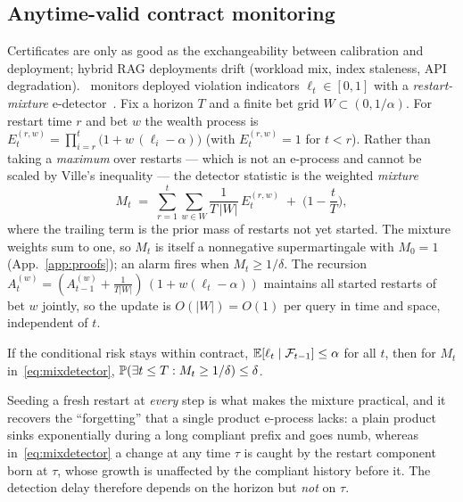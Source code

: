 \subsection{Anytime-valid contract monitoring}
\label{sec:monitor}

Certificates are only as good as the exchangeability between calibration
and deployment; hybrid RAG deployments drift (workload mix, index
staleness, API degradation). \system\ monitors deployed violation
indicators $\ell_t \in [0,1]$ with a \emph{restart-mixture}
e-detector~\cite{shin2024edetectors,ramdas2023savi}. Fix a horizon $T$ and
a finite bet grid $W \subset (0, 1/\alpha)$. For restart time $r$ and bet
$w$ the wealth process is
$E_t^{(r,w)} = \prod_{i=r}^{t} \big(1 + w\,(\ell_i - \alpha)\big)$
(with $E_t^{(r,w)} = 1$ for $t < r$). Rather than taking a
\emph{maximum} over restarts --- which is not an e-process and cannot be
scaled by Ville's inequality --- the detector statistic is the weighted
\emph{mixture}
\begin{equation}
\label{eq:mixdetector}
M_t \;=\; \sum_{r=1}^{t}\sum_{w \in W}
  \frac{1}{T\,|W|}\, E_t^{(r,w)} \;+\; \Big(1 - \frac{t}{T}\Big),
\end{equation}
where the trailing term is the prior mass of restarts not yet started. The
mixture weights sum to one, so $M_t$ is itself a nonnegative
supermartingale with $M_0 = 1$ (App.~\ref{app:proofs}); an alarm fires when
$M_t \ge 1/\delta$. The recursion $A^{(w)}_t = (A^{(w)}_{t-1} +
\tfrac{1}{T|W|})\,(1 + w(\ell_t - \alpha))$ maintains all started restarts
of bet $w$ jointly, so the update is $O(|W|) = O(1)$ per query in time and
space, independent of $t$.

\begin{proposition}
\label{prop:eprocess}
If the conditional risk stays within contract,
$\mathbb{E}[\ell_t \mid \mathcal{F}_{t-1}] \le \alpha$ for all $t$, then for $M_t$
in~\eqref{eq:mixdetector}, $\mathbb{P}(\exists t \le T : M_t \ge 1/\delta) \le \delta$.
\end{proposition}

Seeding a fresh restart at \emph{every} step is what makes the mixture
practical, and it recovers the ``forgetting'' that a single product
e-process lacks: a plain product sinks exponentially during a long
compliant prefix and goes numb, whereas in~\eqref{eq:mixdetector} a change
at any time $\tau$ is caught by the restart component born at $\tau$, whose
growth is unaffected by the compliant history before it. The detection
delay therefore depends on the horizon but \emph{not} on $\tau$.

